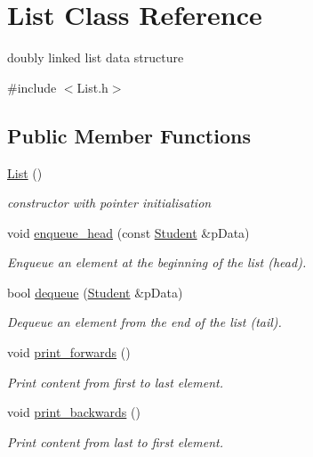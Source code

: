 \hypertarget{class_list}{}\section{List Class Reference}
\label{class_list}


doubly linked list data structure  




{\ttfamily \#include $<$List.\+h$>$}

\subsection*{Public Member Functions}
\begin{DoxyCompactItemize}
\item 
\mbox{\label{class_list_a64d878a92d11f7c63c70cbe4e7dd4176}} 
\hyperlink{class_list_a64d878a92d11f7c63c70cbe4e7dd4176}{List} ()
\begin{DoxyCompactList}\small\item\em constructor with pointer initialisation \end{DoxyCompactList}\item 
void \hyperlink{class_list_abe1c128f9a438009a7ebe1ff946963cf}{enqueue\+\_\+head} (const \hyperlink{class_student}{Student} \&p\+Data)
\begin{DoxyCompactList}\small\item\em Enqueue an element at the beginning of the list (head). \end{DoxyCompactList}\item 
bool \hyperlink{class_list_addc22172363ef656a20069489a1d003f}{dequeue} (\hyperlink{class_student}{Student} \&p\+Data)
\begin{DoxyCompactList}\small\item\em Dequeue an element from the end of the list (tail). \end{DoxyCompactList}\item 
void \hyperlink{class_list_a9cd9aa3b710f2c17acbc41a9c376f337}{print\+\_\+forwards} ()
\begin{DoxyCompactList}\small\item\em Print content from first to last element. \end{DoxyCompactList}\item 
void \hyperlink{class_list_aeff87699c50ed381ba1e765d372ad54b}{print\+\_\+backwards} ()
\begin{DoxyCompactList}\small\item\em Print content from last to first element. \end{DoxyCompactList}\item 

\end{DoxyCompactItemize}
